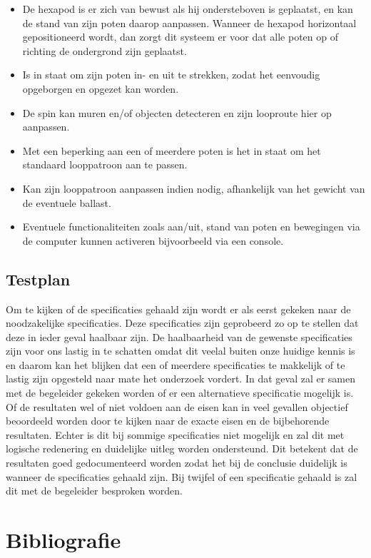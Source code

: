 \documentclass[10pt,a4paper]{article}
\begin{document}
\begin{itemize}
\setlength\itemsep{0em}
\item De hexapod is er zich van bewust als hij ondersteboven is geplaatst, en kan de stand van zijn poten daarop aanpassen. Wanneer de hexapod horizontaal gepositioneerd wordt, dan zorgt dit systeem er voor dat alle poten op of richting de ondergrond zijn geplaatst.
\item Is in staat om zijn poten in- en uit te strekken, zodat het eenvoudig opgeborgen en opgezet kan worden.
\item De spin kan muren en/of objecten detecteren en zijn looproute hier op aanpassen. 
\item Met een beperking aan een of meerdere poten is het in staat om het standaard looppatroon aan te passen.
\item Kan zijn looppatroon aanpassen indien nodig, afhankelijk van het gewicht van de eventuele ballast.
\item Eventuele functionaliteiten zoals aan/uit, stand van poten en bewegingen via de computer kunnen activeren bijvoorbeeld via een console.
\end{itemize}

\subsection{Testplan}
Om te kijken of de specificaties gehaald zijn wordt er als eerst gekeken naar de noodzakelijke specificaties. Deze specificaties zijn geprobeerd zo op te stellen dat deze in ieder geval haalbaar zijn. De haalbaarheid van de gewenste specificaties zijn voor ons lastig in te schatten omdat dit veelal buiten onze huidige kennis is en daarom kan het blijken dat een of meerdere specificaties te makkelijk of te lastig zijn opgesteld naar mate het onderzoek vordert. In dat geval zal er samen met de begeleider gekeken worden of er een alternatieve specificatie mogelijk is.
Of de resultaten wel of niet voldoen aan de eisen kan in veel gevallen objectief beoordeeld worden door te kijken naar de exacte eisen en de bijbehorende resultaten. Echter is dit bij sommige specificaties niet mogelijk en zal dit met logische redenering en duidelijke uitleg worden ondersteund.
Dit betekent dat de resultaten goed gedocumenteerd worden zodat het bij de conclusie duidelijk is wanneer de specificaties gehaald zijn. Bij twijfel of een specificatie gehaald is zal dit met de begeleider besproken worden.



\newpage

\section{Bibliografie}


\end{document}
